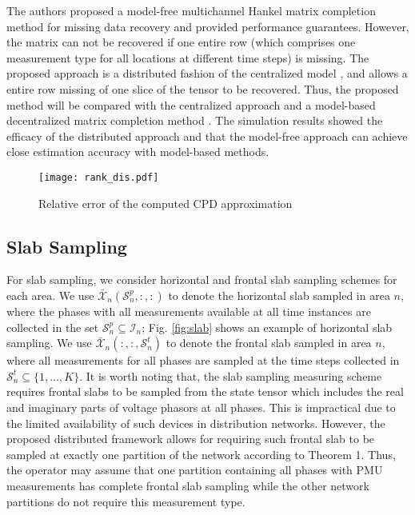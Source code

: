 \documentclass[journal]{IEEEtran}
\newcounter{assume}
\newcounter{propose}
\newcommand{\Ten}[1]{\mathcal{#1}}
\newcommand{\revision}[1]{{\color{black} #1}} %
\newcommand{\rev}[1]{{\color{black} #1}} %
\begin{document}
\rev{The authors \cite{ZhangIEEETSP2018} proposed a model-free multichannel Hankel matrix completion method for missing data recovery and provided performance guarantees. However, the matrix can not be recovered if one entire row (which comprises one measurement type for all locations at different time steps) is missing.}
\rev{The proposed approach is a distributed fashion of the centralized model \cite{Zamzam2020}, and allows a entire row missing of one slice of the tensor to be recovered. Thus, the proposed method will be compared with the centralized approach \cite{Zamzam2020} and a model-based decentralized matrix completion method \cite{Sagan2019}. The simulation results showed the efficacy of the distributed approach and that the model-free approach can achieve close estimation accuracy with model-based methods.}
\iffalse
in the this paper only comparisons with the centralized approach, which was utilized in \cite{Zamzam2020}, are presented showing the efficacy of the decentralized approach. In general, previous simulations showed that the proposed model-free approach can achieve estimation accuracy that is close to model-based methods such as~\cite{Sagan2019}.
\fi
\begin{figure}
    \centering
  \texttt{[image: rank\_dis.pdf]}
    \caption{Relative error of the computed CPD approximation}
    \label{fig:lowrank}\vspace{-15pt}
\end{figure}
\subsection{Slab Sampling}
\label{sec:slabsampling}
For slab sampling, we consider horizontal and frontal slab sampling schemes for each area. We use $\Ten{\bar{X}}_n(\mathcal{S}_n^p, :,:)$  to denote the horizontal slab sampled in area $n$, where the phases with all measurements available at all time instances are collected in the set $\mathcal{S}_n^p\subseteq\mathcal{I}_n$; Fig. \ref{fig:slab} shows an example of horizontal slab sampling. We use $\Ten{\bar{X}}_n(:,:, \mathcal{S}_n^t)$ to denote the frontal slab sampled in area $n$, where all measurements for all phases are sampled at the time steps collected in $\mathcal{S}_n^t\subseteq\{1,\ldots, K\}$.  \rev{It is worth noting that, the slab sampling measuring scheme requires frontal slabs to be sampled from the state tensor which includes the real and imaginary parts of voltage phasors at all phases. This is impractical due to the limited availability of such devices in distribution networks. However, the proposed distributed framework allows for requiring such frontal slab to be sampled at exactly one partition of the network according to Theorem 1. Thus, the operator may assume that one partition containing all phases with PMU measurements has complete frontal slab sampling while the other network partitions do not require this measurement type.}
\end{document}
